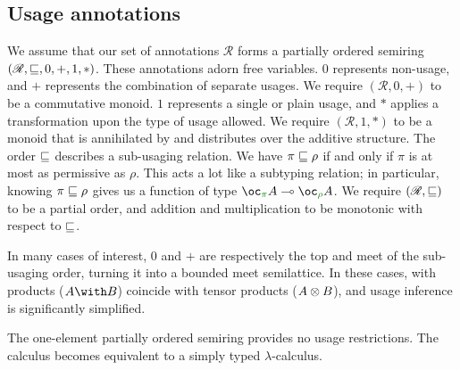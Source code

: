 \subsection{Usage annotations}
\label{sec:annotations}


We assume that our set of annotations $\mathscr R$ forms a partially ordered
semiring $(\mathscr{R}, \sqsubseteq, 0, +, 1, *)$.
These annotations adorn free variables.
$0$ represents non-usage, and $+$ represents the combination of separate usages.
We require $(\mathscr{R}, 0, +)$ to be a commutative monoid.
$1$ represents a single or plain usage, and $*$ applies a transformation upon
the type of usage allowed.
We require $(\mathscr{R}, 1, *)$ to be a monoid that is annihilated by and
distributes over the additive structure.
The order $\sqsubseteq$ describes a sub-usaging relation.
We have $\pi \sqsubseteq \rho$ if and only if $\pi$ is at most as permissive as
$\rho$.
This acts a lot like a subtyping relation; in particular, knowing
$\pi \sqsubseteq \rho$ gives us a function of type
$\fun{\excl{\pi}{A}}{\excl{\rho}{A}}$.
We require $(\mathscr{R}, \sqsubseteq)$ to be a partial order, and addition and
multiplication to be monotonic with respect to $\sqsubseteq$.

In many cases of interest, $0$ and $+$ are respectively the top and meet of the
sub-usaging order, turning it into a bounded meet semilattice.
In these cases, with products ($\withT{A}{B}$) coincide with tensor products
($A \otimes B$), and usage inference is significantly simplified.
 


\begin{example}[Trivial]
  The one-element partially ordered semiring provides no usage restrictions.
  The calculus becomes equivalent to a simply typed $\lambda$-calculus.
\end{example}

